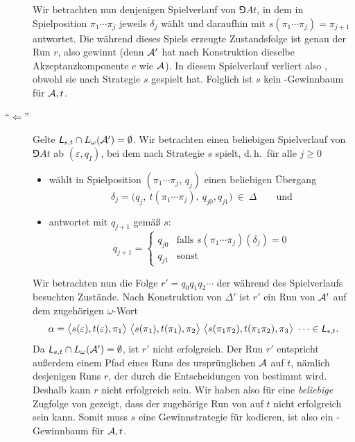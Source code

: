 \documentclass[fontsize=11pt, twoside=false, numbers=autoenddot]{scrbook}
\begin{document}
\begin{description}
    Wir betrachten nun denjenigen Spielverlauf von $\Game{A}{t}$,
    in dem \AUT in Spielposition $\pi_1\cdots\pi_j$ jeweils $\delta_j$ wählt
    und daraufhin \PF mit $s(\pi_1\cdots\pi_j) = \pi_{j+1}$ antwortet.
    Die während dieses Spiels erzeugte Zustandsfolge ist genau der Run $r$,
    also gewinnt \AUT (denn $\mathcal{A}'$ hat nach Konstruktion dieselbe Akzeptanzkomponente $c$
    wie $\mathcal{A}$).
    In diesem Spielverlauf verliert also \PF, obwohl sie nach Strategie $s$ gespielt hat.
    Folglich ist $s$ kein \PF-Gewinnbaum für $\mathcal{A},t$.
    \par\medskip
  \item[{\boldmath"`$\Leftarrow$"'}]
    Gelte $\textsf{\textit{L}}_{s,t} \cap L_\omega(\mathcal{A}') = \emptyset$.
    Wir betrachten einen beliebigen Spielverlauf von $\Game{A}{t}$ ab
    $(\varepsilon,q_I)$, bei dem
    \PF nach Strategie $s$ spielt, d.\,h.\
    für alle $j \geq 0$
    \begin{itemize}
      \item
        wählt \AUT in Spielposition $(\pi_1\cdots\pi_j,\,q_j)$
        einen beliebigen Übergang 
        \[
          \delta_j = \Big(q_j,~ t(\pi_1\cdots \pi_j),~ q_{j0}, q_{j1}\Big) ~\in~ \Delta
          \qquad\text{und}
        \]
      \item
        \PF antwortet mit $q_{j+1}$ gemäß $s$:
        \[
          q_{j+1} = 
          \begin{cases}
            q_{j0} & \text{falls~} s(\pi_1\cdots\pi_j)(\delta_j) = 0 \\
            q_{j1} & \text{sonst}
          \end{cases}
        \]
    \end{itemize}
    Wir betrachten nun die Folge $r'=q_0q_1q_2\cdots$ der während des Spielverlaufs
    besuchten Zustände.
    Nach Konstruktion von $\Delta'$ ist $r'$ ein Run von $\mathcal{A}'$ auf dem
    zugehörigen $\omega$-Wort
    \[
      \alpha = 
      \big\langle s(\varepsilon),t(\varepsilon),\pi_1\big\rangle~
      \big\langle s(\pi_1),t(\pi_1),\pi_2\big\rangle~
      \big\langle s(\pi_1\pi_2),t(\pi_1\pi_2),\pi_3\big\rangle~
      \cdots
      \in \textsf{\textit{L}}_{s,t}.
    \]
    Da $\textsf{\textit{L}}_{s,t} \cap L_\omega(\mathcal{A}') = \emptyset$, ist $r'$ nicht erfolgreich.
    Der Run $r'$ entspricht außerdem einem Pfad eines Runs des ursprünglichen $\mathcal{A}$ auf $t$,
    nämlich desjenigen Runs $r$, der durch die Entscheidungen von \AUT bestimmt wird.
    Deshalb kann $r$ nicht erfolgreich sein.
    Wir haben also für eine \emph{beliebige} Zugfolge von \AUT gezeigt, 
    dass der zugehörige Run von \Amc auf $t$ nicht erfolgreich sein kann.
    Somit muss $s$ eine Gewinnstrategie für \PF kodieren,
    ist also ein \PF-Gewinnbaum für $\mathcal{A},t$.
    \qedhere
\end{description}
\end{document}
